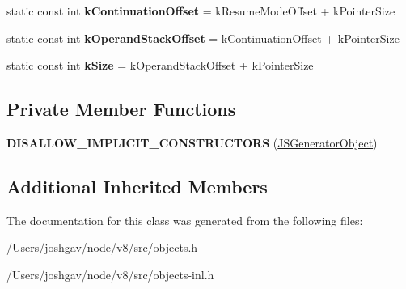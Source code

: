 \begin{DoxyCompactItemize}
\item 
static const int {\bfseries k\+Continuation\+Offset} = k\+Resume\+Mode\+Offset + k\+Pointer\+Size\hypertarget{classv8_1_1internal_1_1_j_s_generator_object_afd60e4d60df80acbd854079dbbb862d2}{}\label{classv8_1_1internal_1_1_j_s_generator_object_afd60e4d60df80acbd854079dbbb862d2}

\item 
static const int {\bfseries k\+Operand\+Stack\+Offset} = k\+Continuation\+Offset + k\+Pointer\+Size\hypertarget{classv8_1_1internal_1_1_j_s_generator_object_a58f03f9140bfd0d328c8caa4f4e32ba5}{}\label{classv8_1_1internal_1_1_j_s_generator_object_a58f03f9140bfd0d328c8caa4f4e32ba5}

\item 
static const int {\bfseries k\+Size} = k\+Operand\+Stack\+Offset + k\+Pointer\+Size\hypertarget{classv8_1_1internal_1_1_j_s_generator_object_afb29636ca53c2710518d76c1faefceef}{}\label{classv8_1_1internal_1_1_j_s_generator_object_afb29636ca53c2710518d76c1faefceef}

\end{DoxyCompactItemize}
\subsection*{Private Member Functions}
\begin{DoxyCompactItemize}
\item 
{\bfseries D\+I\+S\+A\+L\+L\+O\+W\+\_\+\+I\+M\+P\+L\+I\+C\+I\+T\+\_\+\+C\+O\+N\+S\+T\+R\+U\+C\+T\+O\+RS} (\hyperlink{classv8_1_1internal_1_1_j_s_generator_object}{J\+S\+Generator\+Object})\hypertarget{classv8_1_1internal_1_1_j_s_generator_object_af489d64342ea572590bcd97b78e48be1}{}\label{classv8_1_1internal_1_1_j_s_generator_object_af489d64342ea572590bcd97b78e48be1}

\end{DoxyCompactItemize}
\subsection*{Additional Inherited Members}


The documentation for this class was generated from the following files\+:\begin{DoxyCompactItemize}
\item 
/\+Users/joshgav/node/v8/src/objects.\+h\item 
/\+Users/joshgav/node/v8/src/objects-\/inl.\+h\end{DoxyCompactItemize}
